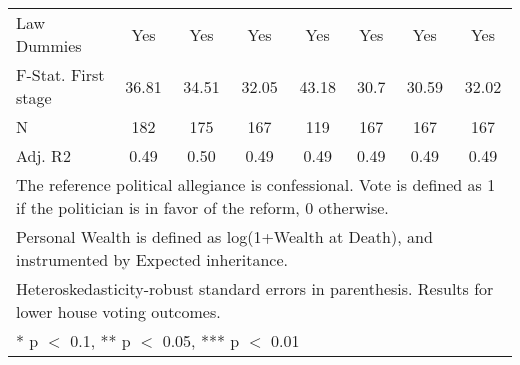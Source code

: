 \begin{table}
\begin{tabular}[t]{lccccccc}
\midrule
Law Dummies & Yes & Yes & Yes & Yes & Yes & Yes & Yes\\
F-Stat. First stage & 36.81 & 34.51 & 32.05 & 43.18 & 30.7 & 30.59 & 32.02\\
N & \num{182} & \num{175} & \num{167} & \num{119} & \num{167} & \num{167} & \num{167}\\
Adj. R2 & \num{0.49} & \num{0.50} & \num{0.49} & \num{0.49} & \num{0.49} & \num{0.49} & \num{0.49}\\
\bottomrule
\multicolumn{8}{l}{\rule{0pt}{1em}The reference political allegiance is confessional. Vote is defined as 1 if the politician is in favor of the reform, 0 otherwise.}\\
\multicolumn{8}{l}{\rule{0pt}{1em}Personal Wealth is defined as log(1+Wealth at Death), and instrumented by Expected inheritance.}\\
\multicolumn{8}{l}{\rule{0pt}{1em}Heteroskedasticity-robust standard errors in parenthesis. Results for lower house voting outcomes.}\\
\multicolumn{8}{l}{\rule{0pt}{1em}* p $<$ 0.1, ** p $<$ 0.05, *** p $<$ 0.01}\\
\end{tabular}
\end{table}
